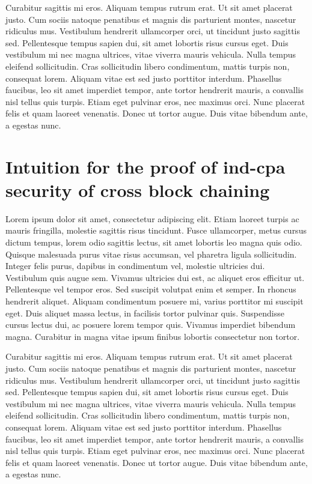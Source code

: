 \documentclass[conference]{IEEEtran}
\begin{document}
Curabitur sagittis mi eros. Aliquam tempus rutrum erat. Ut sit amet placerat justo. Cum sociis natoque penatibus et magnis dis parturient montes, nascetur ridiculus mus. Vestibulum hendrerit ullamcorper orci, ut tincidunt justo sagittis sed. Pellentesque tempus sapien dui, sit amet lobortis risus cursus eget. Duis vestibulum mi nec magna ultrices, vitae viverra mauris vehicula. Nulla tempus eleifend sollicitudin. Cras sollicitudin libero condimentum, mattis turpis non, consequat lorem. Aliquam vitae est sed justo porttitor interdum. Phasellus faucibus, leo sit amet imperdiet tempor, ante tortor hendrerit mauris, a convallis nisl tellus quis turpis. Etiam eget pulvinar eros, nec maximus orci. Nunc placerat felis et quam laoreet venenatis. Donec ut tortor augue. Duis vitae bibendum ante, a egestas nunc.

\section{Intuition for the proof of ind-cpa security of cross block chaining}

Lorem ipsum dolor sit amet, consectetur adipiscing elit. Etiam laoreet turpis ac mauris fringilla, molestie sagittis risus tincidunt. Fusce ullamcorper, metus cursus dictum tempus, lorem odio sagittis lectus, sit amet lobortis leo magna quis odio. Quisque malesuada purus vitae risus accumsan, vel pharetra ligula sollicitudin. Integer felis purus, dapibus in condimentum vel, molestie ultricies dui. Vestibulum quis augue sem. Vivamus ultricies dui est, ac aliquet eros efficitur ut. Pellentesque vel tempor eros. Sed suscipit volutpat enim et semper. In rhoncus hendrerit aliquet. Aliquam condimentum posuere mi, varius porttitor mi suscipit eget. Duis aliquet massa lectus, in facilisis tortor pulvinar quis. Suspendisse cursus lectus dui, ac posuere lorem tempor quis. Vivamus imperdiet bibendum magna. Curabitur in magna vitae ipsum finibus lobortis consectetur non tortor.

Curabitur sagittis mi eros. Aliquam tempus rutrum erat. Ut sit amet placerat justo. Cum sociis natoque penatibus et magnis dis parturient montes, nascetur ridiculus mus. Vestibulum hendrerit ullamcorper orci, ut tincidunt justo sagittis sed. Pellentesque tempus sapien dui, sit amet lobortis risus cursus eget. Duis vestibulum mi nec magna ultrices, vitae viverra mauris vehicula. Nulla tempus eleifend sollicitudin. Cras sollicitudin libero condimentum, mattis turpis non, consequat lorem. Aliquam vitae est sed justo porttitor interdum. Phasellus faucibus, leo sit amet imperdiet tempor, ante tortor hendrerit mauris, a convallis nisl tellus quis turpis. Etiam eget pulvinar eros, nec maximus orci. Nunc placerat felis et quam laoreet venenatis. Donec ut tortor augue. Duis vitae bibendum ante, a egestas nunc.
\end{document}
